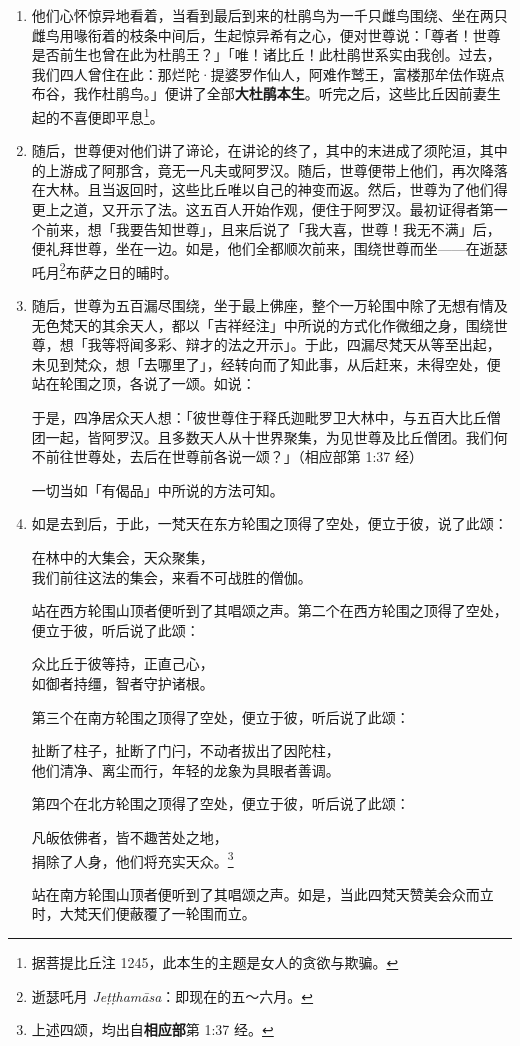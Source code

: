 \begin{enumerate}
\item 他们心怀惊异地看着，当看到最后到来的杜鹃鸟为一千只雌鸟围绕、坐在两只雌鸟用喙衔着的枝条中间后，生起惊异希有之心，便对世尊说：「尊者！世尊是否前生也曾在此为杜鹃王？」「唯！诸比丘！此杜鹃世系实由我创。过去，我们四人曾住在此：那烂陀·提婆罗作仙人，阿难作鹫王，富楼那牟佉作斑点布谷，我作杜鹃鸟。」便讲了全部\textbf{大杜鹃本生}。听完之后，这些比丘因前妻生起的不喜便即平息\footnote{据菩提比丘注 1245，此本生的主题是女人的贪欲与欺骗。}。
\item 随后，世尊便对他们讲了谛论，在讲论的终了，其中的末进成了须陀洹，其中的上游成了阿那含，竟无一凡夫或阿罗汉。随后，世尊便带上他们，再次降落在大林。且当返回时，这些比丘唯以自己的神变而返。然后，世尊为了他们得更上之道，又开示了法。这五百人开始作观，便住于阿罗汉。最初证得者第一个前来，想「我要告知世尊」，且来后说了「我大喜，世尊！我无不满」后，便礼拜世尊，坐在一边。如是，他们全都顺次前来，围绕世尊而坐——在逝瑟吒月\footnote{逝瑟吒月 \textit{Jeṭṭhamāsa}：即现在的五～六月。}布萨之日的晡时。
\item 随后，世尊为五百漏尽围绕，坐于最上佛座，整个一万轮围中除了无想有情及无色梵天的其余天人，都以「吉祥经注」中所说的方式化作微细之身，围绕世尊，想「我等将闻多彩、辩才的法之开示」。于此，四漏尽梵天从等至出起，未见到梵众，想「去哪里了」，经转向而了知此事，从后赶来，未得空处，便站在轮围之顶，各说了一颂。如说：\begin{quoting}于是，四净居众天人想：「彼世尊住于释氏迦毗罗卫大林中，与五百大比丘僧团一起，皆阿罗汉。且多数天人从十世界聚集，为见世尊及比丘僧团。我们何不前往世尊处，去后在世尊前各说一颂？」（相应部第 1:37 经）\end{quoting}一切当如「有偈品」中所说的方法可知。
\item 如是去到后，于此，一梵天在东方轮围之顶得了空处，便立于彼，说了此颂：\begin{quoting}在林中的大集会，天众聚集，\\我们前往这法的集会，来看不可战胜的僧伽。\end{quoting}站在西方轮围山顶者便听到了其唱颂之声。第二个在西方轮围之顶得了空处，便立于彼，听后说了此颂：\begin{quoting}众比丘于彼等持，正直己心，\\如御者持缰，智者守护诸根。\end{quoting}第三个在南方轮围之顶得了空处，便立于彼，听后说了此颂：\begin{quoting}扯断了柱子，扯断了门闩，不动者拔出了因陀柱，\\他们清净、离尘而行，年轻的龙象为具眼者善调。\end{quoting}第四个在北方轮围之顶得了空处，便立于彼，听后说了此颂：\begin{quoting}凡皈依佛者，皆不趣苦处之地，\\捐除了人身，他们将充实天众。\footnote{上述四颂，均出自\textbf{相应部}第 1:37 经。}\end{quoting}站在南方轮围山顶者便听到了其唱颂之声。如是，当此四梵天赞美会众而立时，大梵天们便蔽覆了一轮围而立。

\end{enumerate}
